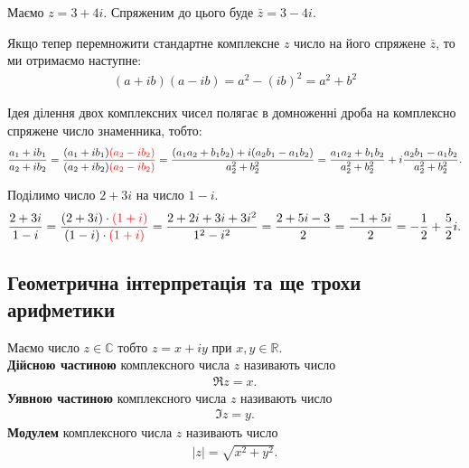 \documentclass{math_library}
\begin{document}
\begin{example}
Маємо $z = 3 + 4i$. Спряженим до цього буде $\bar{z} = 3 - 4i$.
\end{example}

\begin{remark}
Якщо тепер перемножити стандартне комплексне $z$ число на його спряжене $\bar{z}$, то ми отримаємо наступне:
\begin{align*}
(a+ib)(a-ib) = a^2 - (ib)^2 = a^2 + b^2
\end{align*}
\end{remark}

Ідея ділення двох комплексних чисел полягає в домноженні дроба на комплексно спряжене число знаменника, тобто:
\[
\dfrac{a_1+ ib_1}{a_2 + ib_2} = \dfrac{(a_1 + ib_1)\textcolor{red}{(a_2-ib_2)}}{(a_2+ib_2)\textcolor{red}{(a_2-ib_2)}} = \dfrac{(a_1a_2 + b_1b_2) + i(a_2b_1-a_1b_2)}{a_2^2 + b_2^2} = \dfrac{a_1a_2 + b_1b_2}{a_2^2 + b_2^2} + i \dfrac{a_2 b_1 - a_1 b_2}{a_2^2 + b_2^2}.
\]

\begin{example}
Поділимо число $2+3i$ на число $1-i$.
\[
\dfrac{2+3i}{1-i} = \dfrac{(2+3i) \cdot \textcolor{red}{(1+i)}}{(1-i) \cdot \textcolor{red}{(1+i)}} = \dfrac{2+2i+3i+3i^2}{1^2-i^2} = \dfrac{2+5i-3}{2} = \dfrac{-1+5i}{2} = -\dfrac{1}{2} + \dfrac{5}{2}i.
\]
\end{example}

\subsection{Геометрична інтерпретація та ще трохи арифметики}
\begin{definition}
Маємо число $z \in \mathbb{C}$ тобто $z = x + iy$ при $x,y \in \mathbb{R}$.\\
\textbf{Дійсною частиною} комплексного числа $z$ називають число
\begin{align*}
\Re z = x.
\end{align*}
\textbf{Уявною частиною} комплексного числа $z$ називають число
\begin{align*}
\Im z = y.
\end{align*}
\textbf{Модулем} комплексного числа $z$ називають число
\begin{align*}
|z| = \sqrt{x^2+y^2}.
\end{align*}
\end{definition}
\end{document}
